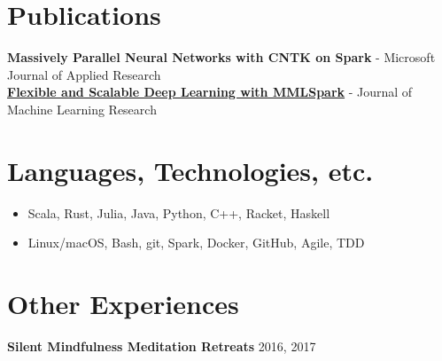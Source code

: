 \documentclass[overlapped]{res}
\begin{document}
\begin{resume}
    \section{Publications}
        {\bf Massively Parallel Neural Networks with CNTK on Spark} - Microsoft Journal of Applied Research \\
        {\bf \href{https://arxiv.org/pdf/1804.04031.pdf}{\underline{Flexible and Scalable Deep Learning with MMLSpark}}} - Journal of Machine Learning Research

    \section{Languages, Technologies, etc.}
    \begin{itemize} \itemsep-2pt
        \item
            Scala, Rust, Julia, Java, Python, C++, Racket, Haskell
        \item
            Linux/macOS, Bash, git, Spark, Docker, GitHub, Agile, TDD
    \end{itemize}

    \section{Other Experiences}

    {\bf Silent Mindfulness Meditation Retreats} \hfill 2016, 2017

\end{resume}
\end{document}

